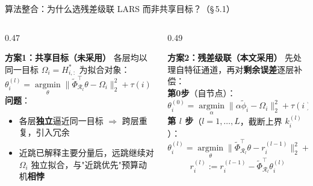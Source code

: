 \documentclass[aspectratio=169,9pt,xcolor=dvipsnames]{beamer}
\newcommand{\highlight}[1]{\textcolor{myred}{\textbf{#1}}}
\newcommand{\green}[1]{\textcolor{mygreen}{#1}}
\begin{document}
\begin{frame}{算法整合：为什么选残差级联 LARS 而非共享目标？（§\,5.1）}
\begin{columns}[T]

\begin{column}{0.47\textwidth}
  \begin{block}{\textbf{\highlight{方案1：共享目标（未采用）}}}
      各层均以同一目标 $\Omega_i=H_{i,:}^*$ 为拟合对象：
    \begin{equation*}
      \theta_{i}^{(l)}
      =\operatorname*{argmin}_\theta
      \bigl\|\tilde{\Phi}_{\mathcal{R}_l}^\top\theta-\Omega_i\bigr\|_2^2
      +\tau(i)\|\theta\|_1,\quad l=0,\ldots,L
    \end{equation*}
    \textbf{问题}：
    \begin{itemize}\setlength{\itemsep}{1pt}
      \item 各层\textbf{独立}逼近同一目标 $\Rightarrow$ 跨层重复，引入冗余
      \item 近跳已解释主要分量后，远跳继续对 $\Omega_i$ 独立拟合，与"近跳优先"预算动机\textbf{相悖}
    \end{itemize}
  \end{block}
\end{column}

\begin{column}{0.49\textwidth}
  \begin{alertblock}{\textbf{\green{方案2：残差级联（本文采用）}}}
      先处理自特征通道，再对\textbf{剩余误差}逐层补偿：\\[3pt]
    \textbf{第0步}（自节点）：
    \begin{equation*}
      \theta_i^{(0)}=\operatorname*{argmin}_\alpha
      \|\alpha\tilde{\phi}_i-\Omega_i\|_2^2+\tau(i)|\alpha|,\quad
      r_i^{(0)}=\Omega_i-\theta_i^{(0)}\tilde{\phi}_i
    \end{equation*}
    \textbf{第 $l$ 步}（$l=1,\ldots,L$，截断上界 $k_i^{(l)}$）：
    \begin{equation*}
      \theta_i^{(l)}=\operatorname*{argmin}_\theta
      \|\tilde{\Phi}_{\mathcal{R}_l}^\top\theta-r_i^{(l-1)}\|_2^2
      +\tau(i)\|\theta\|_1
    \end{equation*}
    \begin{equation*}
      r_i^{(l)}:=r_i^{(l-1)}-\tilde{\Phi}_{\mathcal{R}_l}^\top\theta_i^{(l)}
    \end{equation*}
  \end{alertblock}
\end{column}

\end{columns}


\end{frame}
\end{document}
